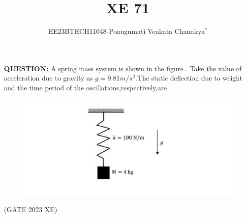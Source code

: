 \documentclass[journal,12pt,twocolumn]{IEEEtran}
\theoremstyle{remark}
\begin{document}
 
 \vspace{3cm}
 \title{\textbf{XE 71}}
 \author{EE23BTECH11048-Ponugumati Venkata Chanakya$^{*}$%
 }
 \maketitle
 \newpage
 \bigskip
 \renewcommand{\thefigure}{\theenumi}
 \renewcommand{\thetable}{\theenumi}
 \textbf{QUESTION:}
 A spring mass system is shown in the figure . Take the value of acceleration  due to gravity as $g=9.81m/s^2$.The static deflection due to weight and the time period of the oscillations,respectively,are\\
 \begin{figure}[h!]
    \centering
    \includegraphics[width = \columnwidth]{figs/xe_71_f1.png}
\end{figure}
\hfill{(GATE 2023 XE)}\\
\solution
\end{document}
